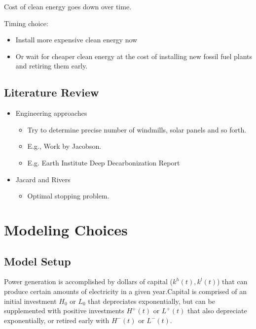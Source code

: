 \documentclass[singlespace]{easychithesis}
\begin{document}
Cost of clean energy goes down over time. 

Timing choice: 

  \begin{itemize}

	\item{Install more expensive clean energy now}
	\item{Or wait for cheaper clean energy at the cost of installing new fossil fuel plants and retiring them early.}

\end{itemize}



\section{Literature Review}

\begin{itemize}
\item Engineering approaches

\begin{itemize}
\item Try to determine precise number of windmills, solar panels and so
forth.

\item E.g., Work by Jacobson.

\item E.g. Earth Institute Deep Decarbonization Report
\end{itemize}

\item Jacard and Rivers

\begin{itemize}
\item Optimal stopping problem.
\end{itemize}
\end{itemize}






\chapter{Modeling Choices}
\section{Model Setup}

Power generation is accomplished by dollars of capital ($k^h(t), k^l(t)$) that can produce certain amounts of electricity in a given year.Capital is comprised of an initial investment $H_0$ or $L_0$ that depreciates exponentially, but can be supplemented with positive investments $H^+(t)$ or $L^+(t)$ that also depreciate exponentially, or retired early with $H^-(t)$ or $L^-(t)$.  \\
\end{document}

